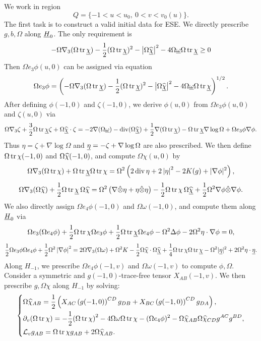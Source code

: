 We work in region 
$$Q=\{-1<u<u_0,\ 0<v<v_0(u)\}.$$ 
The first task is to construct a valid initial data for ESE.
We directly prescribe $g,b,\Omega$ along $\underline H_0$. The only requirement is 
\[-\Omega\nabla_3(\Omega\operatorname{tr}\underline\chi)-\frac{1}{2}(\Omega\operatorname{tr}\underline\chi)^2-\left|\Omega\widehat{\underline\chi}\right|^2-4\Omega\underline\omega\Omega\operatorname{tr}\underline\chi\geq 0\]
Then $\Omega e_3\phi(u,0)$ can be assigned via equation
\[\Omega e_3\phi=\left(-\Omega\nabla_3(\Omega\operatorname{tr}\underline\chi)-\frac{1}{2}(\Omega\operatorname{tr}\underline\chi)^2-\left|\Omega\widehat{\underline\chi}\right|^2-4\Omega\underline\omega\Omega\operatorname{tr}\underline\chi\right)^{1/2}.\]
After defining $\phi(-1,0)$ and $\zeta(-1,0)$, we derive $\phi(u,0)$ from $\Omega e_3\phi(u,0)$ and $\zeta(u,0)$ via
\[\Omega\nabla_3\zeta+\frac{3}{2}\Omega\operatorname{tr}\underline\chi\zeta+\Omega\widehat{\underline\chi}\cdot\zeta=-2\nabla(\Omega\underline\omega)-\operatorname{div}(\Omega\widehat{\underline\chi})+\frac{1}{2}\nabla(\Omega\operatorname{tr}\underline\chi)-\Omega\operatorname{tr}\underline\chi\nabla\log\Omega+\Omega e_3\phi\nabla\phi.\]
Thus $\eta=\zeta+\nabla\log\Omega$ and $\underline\eta=-\zeta+\nabla\log\Omega$ are also prescribed.
We then define $\Omega\operatorname{tr}\chi(-1,0)$ and $\Omega\widehat\chi(-1,0)$, and compute $\Omega\chi(u,0)$ by 
\[\Omega\nabla_3(\Omega\operatorname{tr}\chi)+\Omega\operatorname{tr}\underline\chi\Omega\operatorname{tr}\chi=\Omega^2\left(2\operatorname{div}\eta+2\left|\eta\right|^2-2K(g)+|\nabla\phi|^2\right),\]
\[\Omega\nabla_3(\Omega\widehat\chi)+\frac{1}{2}\Omega\operatorname{tr}\underline\chi\,\Omega\widehat\chi=\Omega^2\left(\nabla\hat\otimes\eta+\eta\hat\otimes\eta\right)-\frac{1}{2}\Omega\operatorname{tr}\chi\,\Omega\widehat{\underline\chi}+\frac{1}{2}\Omega^2\nabla\phi\hat\otimes\nabla\phi.\]
We also directly assign $\Omega e_4\phi(-1,0)$ and $\Omega\omega(-1,0)$, and compute them along $\underline H_0$ via
\[\Omega e_3(\Omega e_4\phi)+\frac{1}{2}\Omega\operatorname{tr}\chi\Omega e_3\phi+\frac{1}{2}\Omega\operatorname{tr}\underline\chi\Omega e_4\phi-\Omega^2\Delta\phi-2\Omega^2\eta\cdot\nabla\phi=0,\]
\[\frac{1}{2}\Omega e_3\phi\Omega e_4\phi+\frac{1}{2}\Omega^2\left|\nabla\phi\right|^2=2\Omega\nabla_3(\Omega\omega)+\Omega^2K-\frac{1}{2}\Omega\widehat\chi\cdot\Omega\widehat{\underline\chi}+\frac{1}{4}\Omega\operatorname{tr}\chi\Omega\operatorname{tr}\underline\chi-\Omega^2|\underline\eta|^2+2\Omega^2\eta\cdot\underline\eta.\]
Along $H_{-1}$, we prescribe $\Omega e_4\phi(-1,v)$ and $\Omega\omega(-1,v)$ to compute $\phi,\Omega$. Consider a symmetric and $g(-1,0)$-trace-free tensor $X_{AB}(-1,v)$.
We then prescribe $g,\Omega\chi$ along $H_{-1}$ by solving:
\begin{equation}
    \left\{\begin{aligned}
         & \Omega\widehat\chi_{AB}=\frac{1}{2}\left(X_{AC}\left(g(-1,0)\right)^{CD}{g}_{DB}+X_{BC}\left(g(-1,0)\right)^{CD}{g}_{DA}\right),\\
        &\partial_v (\Omega\operatorname{tr}\chi)=-\frac{1}{2}{\left(\Omega\operatorname{tr}\chi\right)}^2-4\Omega\omega\Omega\operatorname{tr}\chi-(\Omega e_4\phi)^2-\Omega\widehat\chi_{AB}\Omega\widehat\chi_{CD}g^{AC}g^{BD},\\
        &\mathcal L_v g_{AB}=\Omega\operatorname{tr}\chi g_{AB}+2\Omega\widehat\chi_{AB}.
    \end{aligned}\right.
\end{equation}

